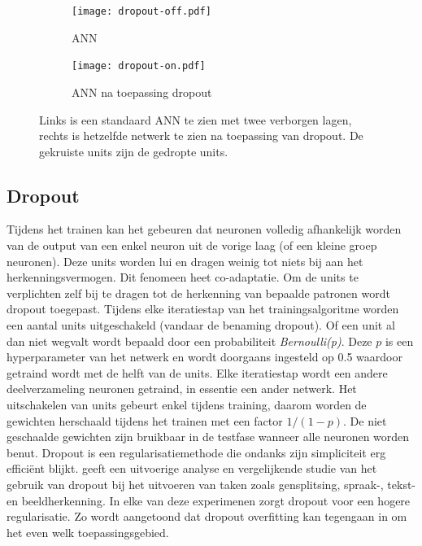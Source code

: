 \begin{figure}[!t]
	\centering
	\begin{subfigure}{.5\textwidth}
		\centering
		\texttt{[image: dropout-off.pdf]}
		\caption{ANN}
		\label{fig:neuron}
	\end{subfigure}%
	\begin{subfigure}{.5\textwidth}
		\centering
		\texttt{[image: dropout-on.pdf]}
		\caption{ANN na toepassing dropout}
		\label{fig:ANN}
	\end{subfigure}
	\caption{Links is een standaard ANN te zien met twee verborgen lagen, rechts is hetzelfde netwerk te zien na toepassing van dropout. De gekruiste units zijn de gedropte units.}
	\label{fig:test}
\end{figure}
\subsection{Dropout}
Tijdens het trainen kan het gebeuren dat neuronen volledig afhankelijk worden van de output van een enkel neuron uit de vorige laag (of een kleine groep neuronen). Deze units worden lui en dragen weinig tot niets bij aan het herkenningsvermogen. Dit fenomeen heet co-adaptatie. Om de units te verplichten zelf bij te dragen tot de herkenning van bepaalde patronen wordt dropout toegepast.
\npar Tijdens elke iteratiestap van het trainingsalgoritme worden een aantal units uitgeschakeld (vandaar de benaming dropout). Of een unit al dan niet wegvalt wordt bepaald door een probabiliteit \textit{Bernoulli(p)}. Deze $p$ is een hyperparameter van het netwerk en wordt doorgaans ingesteld op 0.5 waardoor getraind wordt met de helft van de units. Elke iteratiestap wordt een andere deelverzameling neuronen getraind, in essentie een ander netwerk. Het uitschakelen van units gebeurt enkel tijdens training, daarom worden de gewichten herschaald tijdens het trainen met een factor $1/(1-p)$. De niet geschaalde gewichten zijn bruikbaar in de testfase wanneer alle neuronen worden benut.
\npar Dropout is een regularisatiemethode die ondanks zijn simpliciteit erg effici\"ent blijkt. \cite{dropout} geeft een uitvoerige analyse en vergelijkende studie van het gebruik van dropout bij het uitvoeren van taken zoals gensplitsing, spraak-, tekst- en beeldherkenning. In elke van deze experimenen zorgt dropout voor een hogere regularisatie. Zo wordt aangetoond dat dropout overfitting kan tegengaan in om het even welk toepassingsgebied.

